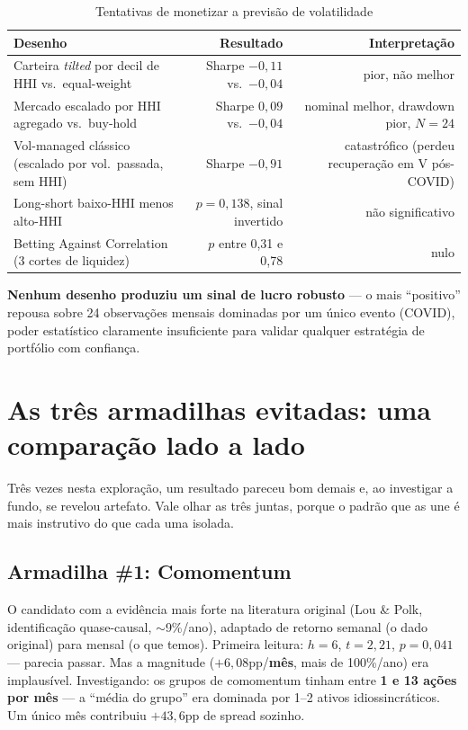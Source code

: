 \documentclass[11pt,a4paper]{article}
\begin{document}
\begin{table}[H]\centering\small
\caption{Tentativas de monetizar a previsão de volatilidade}
\begin{tabular}{@{}p{6cm}rr@{}}
\toprule
Desenho & Resultado & Interpretação \\
\midrule
Carteira \emph{tilted} por decil de HHI vs.\ equal-weight &
Sharpe $-0{,}11$ vs.\ $-0{,}04$ & pior, não melhor \\
Mercado escalado por HHI agregado vs.\ buy-hold &
Sharpe $0{,}09$ vs.\ $-0{,}04$ & nominal melhor, drawdown pior, $N=24$ \\
Vol-managed clássico (escalado por vol.\ passada, sem HHI) &
Sharpe $-0{,}91$ & catastrófico (perdeu recuperação em V pós-COVID) \\
Long-short baixo-HHI menos alto-HHI &
$p=0{,}138$, sinal invertido & não significativo \\
Betting Against Correlation (3 cortes de liquidez) &
$p$ entre 0,31 e 0,78 & nulo \\
\bottomrule
\end{tabular}
\end{table}

\textbf{Nenhum desenho produziu um sinal de lucro robusto} --- o mais
``positivo'' repousa sobre 24 observações mensais dominadas por um único
evento (COVID), poder estatístico claramente insuficiente para validar
qualquer estratégia de portfólio com confiança.

\section{As três armadilhas evitadas: uma comparação lado a lado}
\label{sec:quase}

Três vezes nesta exploração, um resultado pareceu bom demais e, ao
investigar a fundo, se revelou artefato. Vale olhar as três juntas, porque
o padrão que as une é mais instrutivo do que cada uma isolada.

\subsection{Armadilha \#1: Comomentum}
\label{sec:comomentum}

O candidato com a evidência mais forte na literatura original (Lou \&
Polk, identificação quase-causal, $\sim$9\%/ano), adaptado de retorno
semanal (o dado original) para mensal (o que temos). Primeira leitura:
$h=6$, $t=2{,}21$, $p=0{,}041$ --- parecia passar. Mas a magnitude
($+6{,}08$pp/\textbf{mês}, mais de 100\%/ano) era implausível.
Investigando: os grupos de comomentum tinham entre \textbf{1 e 13 ações
por mês} --- a ``média do grupo'' era dominada por 1--2 ativos
idiossincráticos. Um único mês contribuiu $+43{,}6$pp de spread sozinho.
\end{document}

